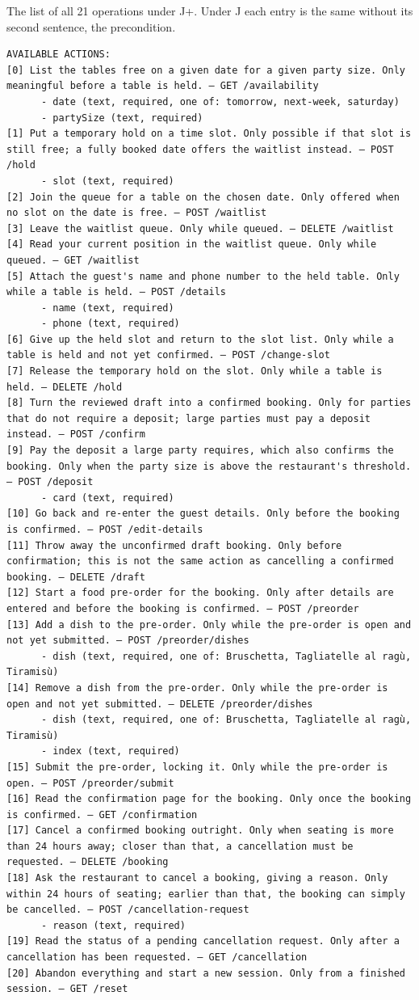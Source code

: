 The list of all 21 operations under J+.
Under J each entry is the same without its second sentence, the precondition.
\begin{Verbatim}
AVAILABLE ACTIONS:
[0] List the tables free on a given date for a given party size. Only meaningful before a table is held. — GET /availability
      - date (text, required, one of: tomorrow, next-week, saturday)
      - partySize (text, required)
[1] Put a temporary hold on a time slot. Only possible if that slot is still free; a fully booked date offers the waitlist instead. — POST /hold
      - slot (text, required)
[2] Join the queue for a table on the chosen date. Only offered when no slot on the date is free. — POST /waitlist
[3] Leave the waitlist queue. Only while queued. — DELETE /waitlist
[4] Read your current position in the waitlist queue. Only while queued. — GET /waitlist
[5] Attach the guest's name and phone number to the held table. Only while a table is held. — POST /details
      - name (text, required)
      - phone (text, required)
[6] Give up the held slot and return to the slot list. Only while a table is held and not yet confirmed. — POST /change-slot
[7] Release the temporary hold on the slot. Only while a table is held. — DELETE /hold
[8] Turn the reviewed draft into a confirmed booking. Only for parties that do not require a deposit; large parties must pay a deposit instead. — POST /confirm
[9] Pay the deposit a large party requires, which also confirms the booking. Only when the party size is above the restaurant's threshold. — POST /deposit
      - card (text, required)
[10] Go back and re-enter the guest details. Only before the booking is confirmed. — POST /edit-details
[11] Throw away the unconfirmed draft booking. Only before confirmation; this is not the same action as cancelling a confirmed booking. — DELETE /draft
[12] Start a food pre-order for the booking. Only after details are entered and before the booking is confirmed. — POST /preorder
[13] Add a dish to the pre-order. Only while the pre-order is open and not yet submitted. — POST /preorder/dishes
      - dish (text, required, one of: Bruschetta, Tagliatelle al ragù, Tiramisù)
[14] Remove a dish from the pre-order. Only while the pre-order is open and not yet submitted. — DELETE /preorder/dishes
      - dish (text, required, one of: Bruschetta, Tagliatelle al ragù, Tiramisù)
      - index (text, required)
[15] Submit the pre-order, locking it. Only while the pre-order is open. — POST /preorder/submit
[16] Read the confirmation page for the booking. Only once the booking is confirmed. — GET /confirmation
[17] Cancel a confirmed booking outright. Only when seating is more than 24 hours away; closer than that, a cancellation must be requested. — DELETE /booking
[18] Ask the restaurant to cancel a booking, giving a reason. Only within 24 hours of seating; earlier than that, the booking can simply be cancelled. — POST /cancellation-request
      - reason (text, required)
[19] Read the status of a pending cancellation request. Only after a cancellation has been requested. — GET /cancellation
[20] Abandon everything and start a new session. Only from a finished session. — GET /reset
\end{Verbatim}


